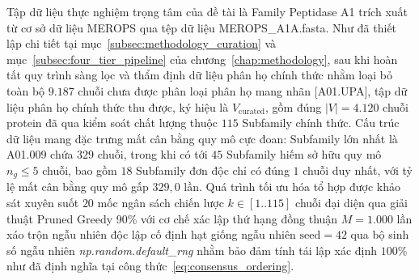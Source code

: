Tập dữ liệu thực nghiệm trọng tâm của đề tài là Family Peptidase A1 trích xuất từ cơ sở dữ liệu MEROPS qua tệp dữ liệu MEROPS\_A1A.fasta. Như đã thiết lập chi tiết tại mục~\ref{subsec:methodology_curation} và mục~\ref{subsec:four_tier_pipeline} của chương~\ref{chap:methodology}, sau khi hoàn tất quy trình sàng lọc và thẩm định dữ liệu phân họ chính thức nhằm loại bỏ toàn bộ $9.187$ chuỗi chưa được phân loại phân họ mang nhãn [A01.UPA], tập dữ liệu phân họ chính thức thu được, ký hiệu là $V_{\text{curated}}$, gồm đúng $|V| = 4.120$ chuỗi protein đã qua kiểm soát chất lượng thuộc $115$ Subfamily chính thức. Cấu trúc dữ liệu mang đặc trưng mất cân bằng quy mô cực đoan: Subfamily lớn nhất là A01.009 chứa $329$ chuỗi, trong khi có tới $45$ Subfamily hiếm sở hữu quy mô $n_g \le 5$ chuỗi, bao gồm $18$ Subfamily đơn độc chỉ có đúng $1$ chuỗi duy nhất, với tỷ lệ mất cân bằng quy mô gấp $329{,}0$ lần. Quá trình tối ưu hóa tổ hợp được khảo sát xuyên suốt $20$ mốc ngân sách chiến lược $k \in [1..115]$ chuỗi đại diện qua giải thuật Pruned Greedy 90\% với cơ chế xác lập thứ hạng đồng thuận $M = 1.000$ lần xáo trộn ngẫu nhiên độc lập cố định hạt giống ngẫu nhiên $\text{seed} = 42$ qua bộ sinh số ngẫu nhiên \textit{np.random.default\_rng} nhằm bảo đảm tính tái lập xác định $100\%$ như đã định nghĩa tại công thức~\eqref{eq:consensus_ordering}.

